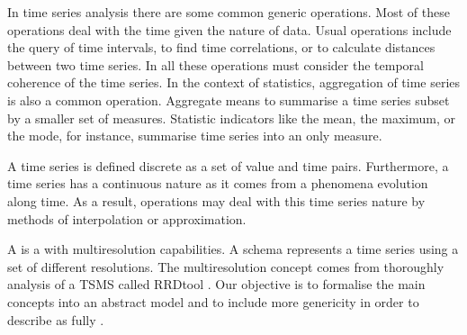 In time series analysis there are some common generic operations.
Most of these operations deal with the time given the nature of data.
Usual operations include the query of time intervals, to find time
correlations, or to calculate distances between two time series. In
all these operations  must consider the temporal coherence
of the time series.  In the context of statistics, aggregation of time
series is also a common operation. Aggregate means to summarise a time
series subset by a smaller set of measures. Statistic indicators like
the mean, the maximum, or the mode, for instance, summarise time
series into an only measure.

A time series is defined discrete as a set of value and time
pairs. Furthermore, a time series has a continuous nature as it comes
from a phenomena evolution along time. As a result, 
operations may deal with this time series nature by methods of
interpolation or approximation.


A  is a  with multiresolution capabilities.  A
 schema represents a time series using a set of different
resolutions.  The multiresolution concept comes from thoroughly
analysis of a TSMS called RRDtool \cite{rrdtool}. Our objective is to
formalise the main concepts into an abstract model and to include more
genericity in order to describe  as fully .



